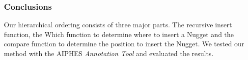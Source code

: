 
\subsubsection{Conclusions}

Our hierarchical ordering consists of three major parts. The recursive insert function, the Which function to determine where to insert a Nugget and the compare function to determine the position to insert the Nugget. We tested our method with the AIPHES \textit{Annotation Tool} and evaluated the results.